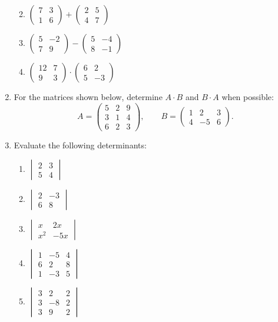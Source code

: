 \documentclass[
  12pt,
  oneside]{book}
\providecommand{\tightlist}{%
  \setlength{\itemsep}{0pt}\setlength{\parskip}{0pt}}
\theoremstyle{definition}
\theoremstyle{definition}
\theoremstyle{definition}
\theoremstyle{definition}
\theoremstyle{remark}
\begin{document}
\begin{enumerate}
  \begin{enumerate}
  \def\labelenumii{\roman{enumii})}
  \tightlist
  \item
    \(\begin{pmatrix}7&3\\1&6\end{pmatrix}+\begin{pmatrix}2&5\\4&7\end{pmatrix}\)
  \item
    \(\begin{pmatrix}5&-2\\7&9\end{pmatrix}-\begin{pmatrix}5&-4\\8&-1\end{pmatrix}\)
  \item
    \(\begin{pmatrix}12&7\\9&3\end{pmatrix}\cdot \begin{pmatrix}6&2\\5&-3\end{pmatrix}\)
  \end{enumerate}
\item
  For the matrices shown below, determine \(A\cdot B\) and \(B\cdot A\) when possible:
  \[A=\begin{pmatrix}5&2&9\\3&1&4\\6&2&3\end{pmatrix},\qquad B=\begin{pmatrix}1&2&3\\4&-5&6\end{pmatrix}.\]
\item
  Evaluate the following determinants:

  \begin{enumerate}
  \def\labelenumii{\roman{enumii})}
  \tightlist
  \item
    \(\begin{vmatrix}2&3\\5&4\end{vmatrix}\)
  \item
    \(\begin{vmatrix}2&-3\\6&8\end{vmatrix}\)
  \item
    \(\begin{vmatrix}x&2x\\x^2&-5x\end{vmatrix}\)
  \item
    \(\begin{vmatrix}1&-5&4\\6&2&8\\1&-3&5\end{vmatrix}\)
  \item
    \(\begin{vmatrix}3&2&2\\3&-8&2\\3&9&2\end{vmatrix}\)
  \end{enumerate}
\end{enumerate}
\end{document}
